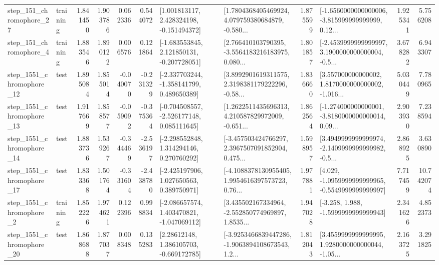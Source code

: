\begin{tabular}{llrrrrllrlrr}
  step\_151\_chromophore\_27 &  training &      1.841450 &    1.903786 &      0.062336 &  0.544072 &    [1.001813117, 2.428324198, -0.151494372] &  [1.7804368405469924, 4.079759380684879, -0.580... &       1.875599 &  [-1.6560000000000006, -3.815999999999999, 0.12... &            1.925341 &          5.756208 \\
   step\_151\_chromophore\_4 &  training &      1.883546 &    1.890122 &      0.006576 &  0.121864 &   [-1.683553845, 2.121850131, -0.207728051] &  [2.766410103790395, -3.5564183216183975, 0.080... &       1.801857 &  [-2.4539999999999997, 3.1900000000000004, -0.5... &            3.678282 &          6.943307 \\
 step\_1551\_chromophore\_12 &      test &      1.895084 &    1.855014 &     -0.040070 & -0.231329 &   [-2.337703244, -1.358141799, 0.489650389] &  [3.8992901619311575, 2.3198381179222296, -0.58... &       1.836660 &  [3.557000000000002, 1.8170000000000002, -1.016... &            5.030449 &          7.780965 \\
 step\_1551\_chromophore\_13 &      test &      1.917669 &    1.858577 &     -0.059092 & -0.375364 &   [-0.704508557, -2.526177148, 0.085111645] &  [1.2622511435696313, 4.210587829972009, -0.651... &       1.862564 &  [-1.274000000000001, -3.8180000000000014, 0.09... &            2.903930 &          7.238594 \\
 step\_1551\_chromophore\_14 &      test &      1.883736 &    1.539267 &     -0.344469 & -2.536197 &    [-2.298552848, 1.314294146, 0.270760292] &  [-3.457503424766297, 2.3967507091852904, 0.475... &       1.598957 &  [3.4949999999999974, -2.1409999999999982, -0.5... &            2.868925 &          3.630890 \\
 step\_1551\_chromophore\_17 &      test &      1.833368 &    1.501764 &     -0.331604 & -2.438780 &    [-2.425197906, 1.027650563, 0.389750971] &  [-4.1088378130955405, 1.9954616397573723, 0.76... &       1.977881 &  [4.029, -1.0959999999999965, -0.5549999999999997] &            7.717459 &         10.742074 \\
  step\_1551\_chromophore\_2 &  training &      1.852226 &    1.974621 &      0.122396 &  0.998834 &   [-2.086657574, 1.403470821, -1.047069112] &  [3.435502167334964, -2.552850774969897, 1.8535... &       1.947028 &               [-3.258, 1.988, -1.5999999999999943] &            2.341626 &          4.852373 \\
 step\_1551\_chromophore\_20 &      test &      1.868688 &    1.877037 &      0.008348 &  0.135283 &     [2.28612148, 1.386105703, -0.669172785] &  [-3.9253466839447286, -1.9063894108673543, 1.2... &       1.812043 &  [3.4559999999999995, 1.9280000000000044, -1.05... &            2.163725 &          3.291825 \\

\end{tabular}

